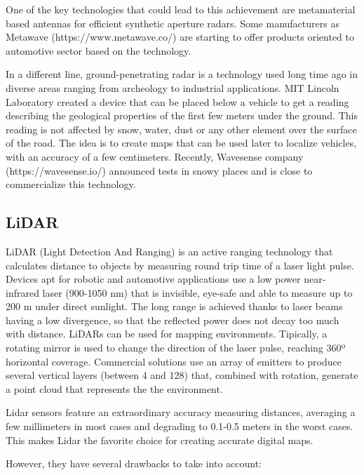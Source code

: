 One of the key technologies that could lead to this achievement are metamaterial
based antennas \cite{Brookner2016,Sleasman2017} for efficient synthetic aperture
radars. Some manufacturers as Metawave (https://www.metawave.co/) are starting 
to offer products oriented to automotive sector based on the technology.

In a different line, ground-penetrating radar is a technology used long
time ago in diverse areas ranging from archeology to industrial applications.
MIT Lincoln Laboratory created a device \cite{Cornick2016} that can be placed 
below a vehicle to get a reading describing the geological properties of the
first few meters under the ground. This reading is not affected by snow, 
water, dust or any other element over the surface of the road. The idea is to
create maps that can be used later to localize vehicles, with an accuracy of
a few centimeters. \cite{XXXX}
Recently, Wavesense company (https://wavesense.io/) announced tests in snowy
places and is close to commercialize this technology.



\subsection{LiDAR}
LiDAR (Light Detection And Ranging) is an active ranging technology that calculates distance to objects by measuring round trip time of a laser light pulse.
Devices apt for robotic and automotive applications use a low power 
near-infrared laser (900-1050 nm) that is invisible, eye-safe and able to 
measure up to 200 m under direct sunlight. The long range is achieved thanks to
laser beams having a low divergence, so that the reflected power does not decay
too much with distance.
LiDARs can be used for mapping environments. Tipically, a rotating mirror is used to change the direction of the laser pulse, reaching 360º horizontal coverage. Commercial solutions use an array of emitters to produce several vertical layers (between 4 and 128) that, combined with rotation, generate a point cloud that represents the the environment.

Lidar sensors feature an extraordinary accuracy measuring distances, averaging
a few millimeters in most cases and degrading to 0.1-0.5 meters in the worst 
cases. This makes Lidar the favorite choice for creating accurate digital maps.

However, they have several drawbacks to take into account:

